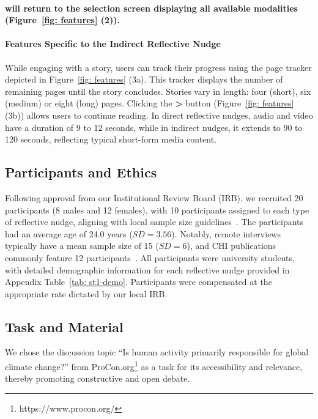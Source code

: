 \paragraph{ will return to the selection screen displaying all available modalities (Figure~\ref{fig: features} (2)).}

\paragraph{Features Specific to the Indirect Reflective Nudge}
While engaging with a story, users can track their progress using the page tracker depicted in Figure~\ref{fig: features} (3a). This tracker displays the number of remaining pages until the story concludes. Stories vary in length: four (short), six (medium) or eight (long) pages. Clicking the \textbf{\huge{>}} button (Figure~\ref{fig: features} (3b)) allows users to continue reading. In direct reflective nudges, audio and video have a duration of 9 to 12 seconds, while in indirect nudges, it extends to 90 to 120 seconds, reflecting typical short-form media content.

\subsection{Participants and Ethics}
Following approval from our Institutional Review Board (IRB), we recruited 20 participants (8 males and 12 females), with 10 participants assigned to each type of reflective nudge, aligning with local sample size guidelines~\cite{caine2016local}. The participants had an average age of 24.0 years ($SD=3.56$). Notably, remote interviews typically have a mean sample size of 15 ($SD=6$), and CHI publications commonly feature 12 participants~\cite{caine2016local}. All participants were university students, with detailed demographic information for each reflective nudge provided in Appendix Table~\ref{tab: st1-demo}. Participants were compensated at the appropriate rate dictated by our local IRB.

\subsection{Task and Material}
\label{sec:maintask}
We chose the discussion topic “Is human activity primarily responsible for global climate change?” from ProCon.org\footnote{https://www.procon.org/} as a task for its accessibility and relevance, thereby promoting constructive and open debate.

